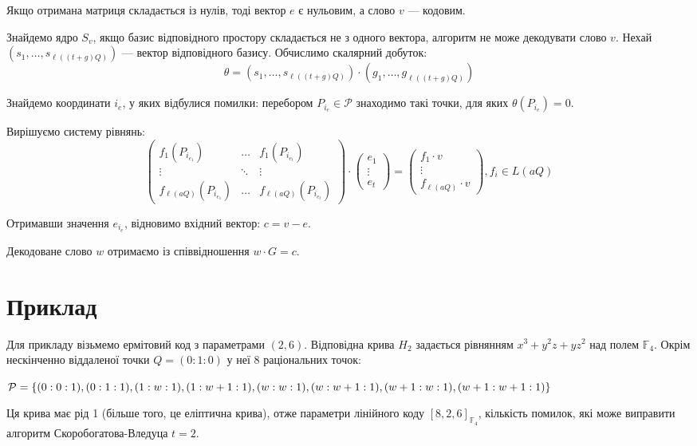 \documentclass[a4paper,12pt,oneside]{article}
\begin{document}
Якщо отримана матриця складається із нулів, тоді вектор $e$ є нульовим, а слово $v$ --- кодовим.

Знайдемо ядро $S_v$, якщо базис відповідного простору складається не з одного вектора, алгоритм не може декодувати слово $v$.
Нехай $(s_1, \dots, s_{\ell( (t+g)Q )})$ --- вектор відповідного базису. Обчислимо скалярний добуток:
$$\theta = (s_1, \dots, s_{\ell( (t+g)Q )}) \cdot (g_1, \dots, g_{\ell( (t+g)Q )})$$

Знайдемо координати $i_e$, у яких відбулися помилки: перебором $P_{i_e} \in \mathcal{P}$ знаходимо такі точки, для яких $\theta(P_{i_e})=0$.

Вирішуємо систему рівнянь:
$$
\begin{pmatrix}
    f_1 ( P_{i_{e_1}} ) & \dots & f_1 ( P_{i_{e_t}} ) \\
    \vdots & \ddots & \vdots \\
    f_{\ell(aQ)} ( P_{i_{e_1}} ) & \dots & f_{\ell(aQ)} ( P_{i_{e_t}} )
\end{pmatrix} \cdot 
\begin{pmatrix}
    e_1 \\
    \vdots \\
    e_t
\end{pmatrix} = 
\begin{pmatrix}
    f_1 \cdot v \\
    \vdots \\
    f_{\ell(aQ)} \cdot v
\end{pmatrix}, f_i \in L(aQ)
$$

Отримавши значення $e_{i_e}$, відновимо вхідний вектор: $c = v - e$.

Декодоване слово $w$ отримаємо із співвідношення $w \cdot G = c$.



\section{Приклад}
Для прикладу візьмемо ермітовий код з параметрами $(2,6)$. Відповідна крива $H_2$ задається рівнянням $x^3 + y^2 z + y z^2$ над полем $\mathbb{F}_4$. 
Окрім нескінченно віддаленої точки $Q = (0 : 1 : 0)$ у неї 8 раціональних точок:

$\mathcal{P} = \{ (0 : 0 : 1), (0 : 1 : 1), (1 : w : 1), (1 : w + 1 : 1), (w : w : 1), \\
 (w : w + 1 : 1), (w + 1 : w : 1), (w + 1 : w + 1 : 1)\}$

Ця крива має рід 1 (більше того, це еліптична крива), отже параметри лінійного коду $[8, 2, 6]_{\mathbb{F}_4}$, кількість помилок, які може виправити 
алгоритм Скоробогатова-Вледуца $t=2$.
\end{document}
